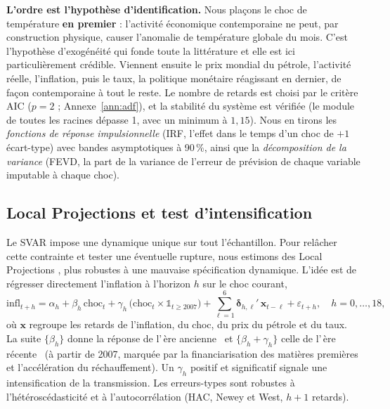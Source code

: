 \documentclass[11pt,a4paper]{article}
\providecommand{\og}{\guillemotleft\,}
\providecommand{\fg}{\,\guillemotright}
\begin{document}
\textbf{L'ordre est l'hypothèse d'identification.} Nous plaçons le choc de température
\textbf{en premier} : l'activité économique contemporaine ne peut, par construction
physique, causer l'anomalie de température globale du mois. C'est l'hypothèse d'exogénéité
qui fonde toute la littérature \citep{faccia2021,kotz2024} et elle est ici particulièrement
crédible. Viennent ensuite le prix mondial du pétrole, l'activité réelle, l'inflation, puis
le taux, la politique monétaire réagissant en dernier, de façon contemporaine à tout le reste.
Le nombre de retards est choisi par le critère AIC ($p=2$ ; Annexe~\ref{ann:adf}), et la
stabilité du système est vérifiée (le module de toutes les racines dépasse 1, avec un minimum
à $1{,}15$). Nous en tirons les \emph{fonctions de réponse impulsionnelle} (IRF, l'effet dans le temps d'un choc
de $+1$ écart-type) avec bandes asymptotiques à 90\,\%, ainsi que la \emph{décomposition de la
variance} (FEVD, la part de la variance de l'erreur de prévision de chaque variable imputable à
chaque choc).

\subsection{Local Projections et test d'intensification}
\label{sec:lp}
Le SVAR impose une dynamique unique sur tout l'échantillon. Pour relâcher cette
contrainte et tester une éventuelle rupture, nous estimons des Local Projections
\citep{jorda2005}, plus robustes à une mauvaise spécification dynamique. L'idée est de régresser
directement l'inflation à l'horizon $h$ sur le choc courant,
\begin{equation}
\mathrm{infl}_{t+h} = \alpha_h + \beta_h\,\mathrm{choc}_t
+ \gamma_h\,\big(\mathrm{choc}_t \times \mathbb{1}_{t\geq 2007}\big)
+ \sum_{\ell=1}^{6}\boldsymbol{\delta}_{h,\ell}'\,\mathbf{x}_{t-\ell} + \varepsilon_{t+h},
\quad h=0,\dots,18,
\end{equation}
où $\mathbf{x}$ regroupe les retards de l'inflation, du choc, du prix du pétrole et du taux.
La suite $\{\beta_h\}$ donne la réponse de l'\og ère ancienne \fg{} et $\{\beta_h+\gamma_h\}$
celle de l'\og ère récente \fg{} (à partir de 2007, marquée par la financiarisation des matières
premières et l'accélération du réchauffement). Un $\gamma_h$ positif et significatif
signale une intensification de la transmission. Les erreurs-types sont robustes à
l'hétéroscédasticité et à l'autocorrélation (HAC, Newey et West, $h+1$ retards).
\end{document}
